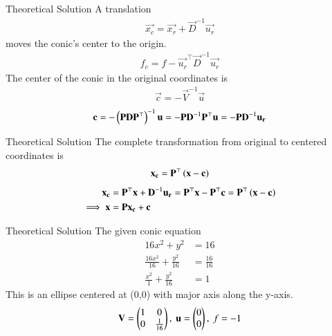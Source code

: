 \documentclass{beamer}
\begin{document}
\begin{frame}{Theoretical Solution}
A translation 
\begin{align}
    \vec{x_c} = \vec{x_r} + \vec{D}^{-1}\vec{u_r}
\end{align}
moves the conic's center to the origin.
\begin{align}
    f_c = f - \vec{u_r}^\top\vec{D}^{-1}\vec{u_r}
\end{align}
The center of the conic in the original coordinates is 
\begin{align}
    \vec{c} = -\vec{V}^{-1}\vec{u}
\end{align}
\begin{align}
    \mathbf{c} = -\left(\mathbf{P}\mathbf{D}\mathbf{P}^\top\right)^{-1}\mathbf{u} = -\mathbf{P}\mathbf{D}^{-1}\mathbf{P}^\top\mathbf{u} = -\mathbf{P}\mathbf{D}^{-1}\mathbf{u_r}
\end{align}
\end{frame}

\begin{frame}{Theoretical Solution}
The complete transformation from original to centered coordinates is 
\begin{align}
    \mathbf{x_c} = \mathbf{P}^\top\left(\mathbf{x}-\mathbf{c}\right)
\end{align}
\begin{align}
    \mathbf{x_c} &= \mathbf{P}^\top\mathbf{x} + \mathbf{D}^{-1}\mathbf{u_r} = \mathbf{P}^\top\mathbf{x} - \mathbf{P}^\top\mathbf{c} = \mathbf{P}^\top\left(\mathbf{x}-\mathbf{c}\right) \\
    \implies \mathbf{x} &= \mathbf{P}\mathbf{x_c} + \mathbf{c} \label{eq:71}
\end{align}
\end{frame}

\begin{frame}{Theoretical Solution}
The given conic equation
\begin{align}
    16x^2 + y^2 &= 16 \\
    \frac{16x^2}{16} + \frac{y^2}{16} &= \frac{16}{16} \\
    \frac{x^2}{1} + \frac{y^2}{16} &= 1
\end{align}
This is an ellipse centered at (0,0) with major axis along the y-axis.
\begin{align}
    \mathbf{V} = \begin{pmatrix}1 & 0 \\ 0 & \frac{1}{16}\end{pmatrix}, \text{ } \mathbf{u} = \begin{pmatrix}0 \\ 0\end{pmatrix}, \text{ } f = -1
\end{align}
\end{frame}
\end{document}
